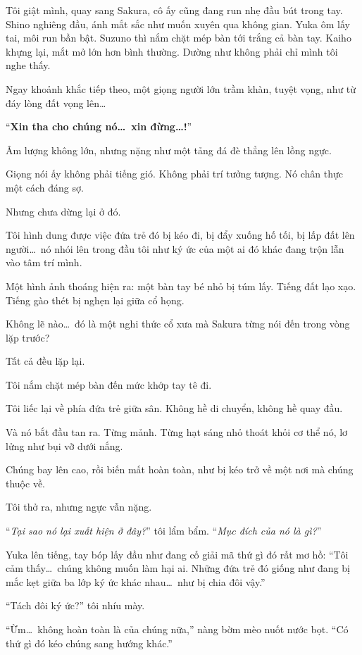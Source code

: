 \documentclass[../main.tex]{subfiles}
\begin{document}
Tôi giật mình, quay sang Sakura,  cô ấy cũng đang run nhẹ đầu bút trong tay. Shino nghiêng đầu, ánh mắt sắc như muốn xuyên qua không gian. Yuka ôm lấy tai, môi run bần bật. Suzuno thì nắm chặt mép bàn tới trắng cả bàn tay. Kaiho khựng lại, mắt mở lớn hơn bình thường. Dường như không phải chỉ mình tôi nghe thấy.

Ngay khoảnh khắc tiếp theo, một giọng người lớn trầm khàn, tuyệt vọng, như từ đáy lòng đất vọng lên\dots

``\textbf{Xin tha cho chúng nó\dots\ xin đừng\dots!}''

Âm lượng không lớn, nhưng nặng như một tảng đá đè thẳng lên lồng ngực.

Giọng nói ấy không phải tiếng gió. Không phải trí tưởng tượng. Nó chân thực một cách đáng sợ.

Nhưng chưa dừng lại ở đó.

Tôi hình dung được việc đứa trẻ đó bị kéo đi, bị đẩy xuống hố tối, bị lấp đất lên người\dots\ nó nhói lên trong đầu tôi như ký ức của một ai đó khác đang trộn lẫn vào tâm trí mình.

Một hình ảnh thoáng hiện ra: một bàn tay bé nhỏ bị túm lấy. Tiếng đất lạo xạo. Tiếng gào thét bị nghẹn lại giữa cổ họng.

Không lẽ nào\dots\ đó là một nghi thức cổ xưa mà Sakura từng nói đến trong vòng lặp trước?

Tất cả đều lặp lại.

Tôi nắm chặt mép bàn đến mức khớp tay tê đi.

Tôi liếc lại về phía đứa trẻ giữa sân. Không hề di chuyển, không hề quay đầu.

Và nó bắt đầu tan ra. Từng mảnh. Từng hạt sáng nhỏ thoát khỏi cơ thể nó, lơ lửng như bụi vỡ dưới nắng.

Chúng bay lên cao, rồi biến mất hoàn toàn, như bị kéo trở về một nơi mà chúng thuộc về.

Tôi thở ra, nhưng ngực vẫn nặng.

``\textit{Tại sao nó lại xuất hiện ở đây?}'' tôi lẩm bẩm. ``\textit{Mục đích của nó là gì?}''

Yuka lên tiếng, tay bóp lấy đầu như đang cố giải mã thứ gì đó rất mơ hồ: ``Tôi cảm thấy\dots\ chúng không muốn làm hại ai. Những đứa trẻ đó giống như đang bị mắc kẹt giữa ba lớp ký ức khác nhau\dots\ như bị chia đôi vậy.''

``Tách đôi ký ức?'' tôi nhíu mày.

``Ừm\dots\ không hoàn toàn là của chúng nữa,'' nàng bờm mèo nuốt nước bọt. ``Có thứ gì đó kéo chúng sang hướng khác.''
\end{document}
